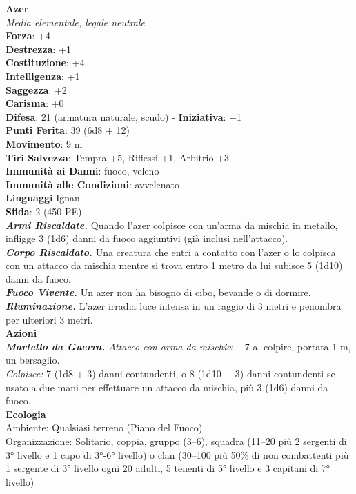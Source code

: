 \begin{multicols}{2}
\medskip\textbf{Azer}\\
\emph{Media elementale, legale neutrale}\\
\textbf{Forza}: +4\\
\textbf{Destrezza}: +1\\
\textbf{Costituzione}: +4\\
\textbf{Intelligenza}: +1\\
\textbf{Saggezza}: +2\\
\textbf{Carisma}: +0\\
\textbf{Difesa}: 21 (armatura naturale, scudo) - \textbf{Iniziativa}: +1\\
\textbf{Punti Ferita}: 39 (6d8 + 12)\\
\textbf{Movimento}: 9 m\\
\textbf{Tiri Salvezza}: Tempra +5, Riflessi +1, Arbitrio +3\\
\textbf{Immunità ai Danni}: fuoco, veleno\\
\textbf{Immunità alle Condizioni}: avvelenato\\
\textbf{Linguaggi} Ignan\\
\textbf{Sfida}: 2 (450 PE)\smallskip\\
\emph{\textbf{Armi Riscaldate.}} Quando l'azer colpisce con un'arma da mischia in metallo, infligge 3 (1d6) danni da fuoco aggiuntivi (già inclusi nell'attacco).\\
\emph{\textbf{Corpo Riscaldato.}} Una creatura che entri a contatto con l'azer o lo colpisca con un attacco da mischia mentre si trova entro 1 metro da lui subisce 5 (1d10) danni da fuoco.\\
\emph{\textbf{Fuoco Vivente.}} Un azer non ha bisogno di cibo, bevande o di dormire.\\
\emph{\textbf{Illuminazione.}} L'azer irradia luce intensa in un raggio di 3 metri e penombra per ulteriori 3 metri.\\
\smallskip\textbf{Azioni}\\
\emph{\textbf{Martello da Guerra.} Attacco con arma da mischia}: +7 al colpire, portata 1 m, un bersaglio.\\
\emph{Colpisce:} 7 (1d8 + 3) danni contundenti, o 8 (1d10 + 3) danni contundenti se usato a due mani per effettuare un attacco da mischia, più 3 (1d6) danni da fuoco.\\
\textbf{Ecologia}\\
Ambiente: Qualsiasi terreno (Piano del Fuoco)\\
Organizzazione: Solitario, coppia, gruppo (3–6), squadra (11–20 più 2 sergenti di 3° livello e 1 capo di 3°-6° livello) o clan (30–100 più 50\% di non combattenti più 1 sergente di 3° livello ogni 20 adulti, 5 tenenti di 5° livello e 3 capitani di 7° livello)\\

\end{multicols}
